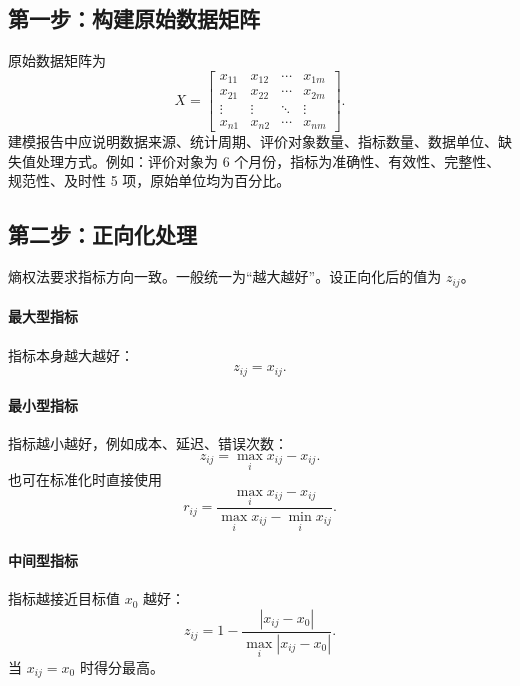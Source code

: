 \documentclass[UTF8,zihao=-4]{ctexart}
\begin{document}
\subsection{第一步：构建原始数据矩阵}
原始数据矩阵为
\begin{equation}
X=\begin{bmatrix}
 x_{11} & x_{12} & \cdots & x_{1m}\\
 x_{21} & x_{22} & \cdots & x_{2m}\\
 \vdots & \vdots & \ddots & \vdots\\
 x_{n1} & x_{n2} & \cdots & x_{nm}
\end{bmatrix}.
\end{equation}
建模报告中应说明数据来源、统计周期、评价对象数量、指标数量、数据单位、缺失值处理方式。例如：评价对象为 6 个月份，指标为准确性、有效性、完整性、规范性、及时性 5 项，原始单位均为百分比。

\subsection{第二步：正向化处理}
熵权法要求指标方向一致。一般统一为“越大越好”。设正向化后的值为 $z_{ij}$。

\paragraph{最大型指标}指标本身越大越好：
\begin{equation}
z_{ij}=x_{ij}.
\end{equation}

\paragraph{最小型指标}指标越小越好，例如成本、延迟、错误次数：
\begin{equation}
z_{ij}=\max_i x_{ij}-x_{ij}.
\end{equation}
也可在标准化时直接使用
\begin{equation}
r_{ij}=\frac{\max_i x_{ij}-x_{ij}}{\max_i x_{ij}-\min_i x_{ij}}.
\end{equation}

\paragraph{中间型指标}指标越接近目标值 $x_0$ 越好：
\begin{equation}
z_{ij}=1-\frac{|x_{ij}-x_0|}{\max_i |x_{ij}-x_0|}.
\end{equation}
当 $x_{ij}=x_0$ 时得分最高。
\end{document}
